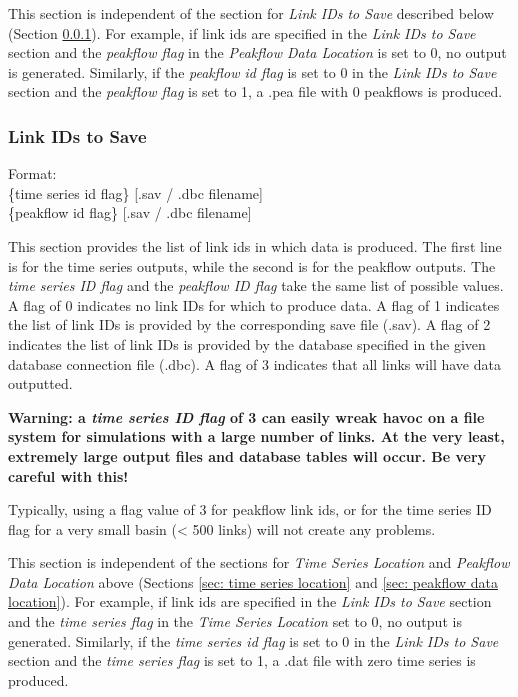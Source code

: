\documentclass[12pt]{article}
\newenvironment{codeindent}
{\begin{list}{}
        {\setlength{\leftmargin}{.1in}}
        \item[]
}
{\end{list}}
\begin{document}
This section is independent of the section for \textit{Link IDs to Save} described below (Section \ref{sec: link ids to save}). For example, if link ids are specified in the \textit{Link IDs to Save} section and the \textit{peakflow flag} in the \textit{Peakflow Data Location} is set to 0, no output is generated. Similarly, if the \textit{peakflow id flag} is set to 0 in the \textit{Link IDs to Save} section and the \textit{peakflow flag} is set to 1, a .pea file with 0 peakflows is produced.


\subsubsection{Link IDs to Save} \label{sec: link ids to save}

\begin{codeindent}
 Format: \\
 \{time series id flag\} [.sav / .dbc filename] \\
 \{peakflow id flag\} [.sav / .dbc filename]
\end{codeindent}

This section provides the list of link ids in which data is produced. The first line is for the time series outputs, while the second is for the peakflow outputs. The \textit{time series ID flag} and the \textit{peakflow ID flag} take the same list of possible values. A flag of 0 indicates no link IDs for which to produce data. A flag of 1 indicates the list of link IDs is provided by the corresponding save file (.sav). A flag of 2 indicates the list of link IDs is provided by the database specified in the given database connection file (.dbc). A flag of 3 indicates that all links will have data outputted.

\textbf{Warning: a \emph{time series ID flag} of 3 can easily wreak havoc on a file system for simulations with a large number of links. At the very least, extremely large output files and database tables will occur. Be very careful with this!}

Typically, using a flag value of 3 for peakflow link ids, or for the time series ID flag for a very small basin (< 500 links) will not create any problems.

This section is independent of the sections for \textit{Time Series Location} and \textit{Peakflow Data Location} above (Sections \ref{sec: time series location} and \ref{sec: peakflow data location}). For example, if link ids are specified in the \textit{Link IDs to Save} section and the \textit{time series flag} in the \textit{Time Series Location} set to 0, no output is generated. Similarly, if the \textit{time series id flag} is set to 0 in the \textit{Link IDs to Save} section and the \textit{time series flag} is set to 1, a .dat file with zero time series is produced.
 
\end{document}
